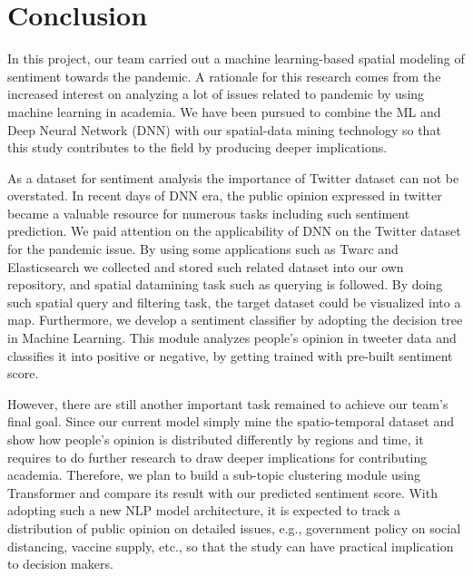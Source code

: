 \section{Conclusion}
In this project, our team carried out a machine learning-based spatial
modeling of sentiment towards the pandemic. A rationale for this research
comes from the increased interest on analyzing a lot of issues related to
pandemic by using machine learning in academia. We have been pursued to
combine the ML and Deep Neural Network (DNN) with our spatial-data mining
technology so that this study contributes to the field by producing deeper
implications.

As a dataset for sentiment analysis the importance of Twitter dataset can not
be overstated. In recent days of DNN era, the public opinion expressed in
twitter became a valuable resource for numerous tasks including such
sentiment prediction. We paid attention on the applicability of DNN on the
Twitter dataset for the pandemic issue. By using some applications such as
Twarc and Elasticsearch we collected and stored such related dataset into our
own repository, and spatial datamining task such as querying is followed. By
doing such spatial query and filtering task, the target dataset could be
visualized into a map. Furthermore, we develop a sentiment classifier by
adopting the decision tree in Machine Learning. This module analyzes people's
opinion in tweeter data and classifies it into positive or negative, by
getting trained with pre-built sentiment score.

However, there are still another important task remained to achieve our team's
final goal. Since our current model simply mine the spatio-temporal dataset
and show how people's opinion is distributed differently by regions and time,
it requires to do further research to draw deeper implications for
contributing academia. Therefore, we plan to build a sub-topic clustering
module using Transformer and compare its result with our predicted sentiment
score. With adopting such a new NLP model architecture, it is expected to
track a distribution of public opinion on detailed issues, e.g., government
policy on social distancing, vaccine supply, etc., so that the study can have
practical implication to decision makers. 